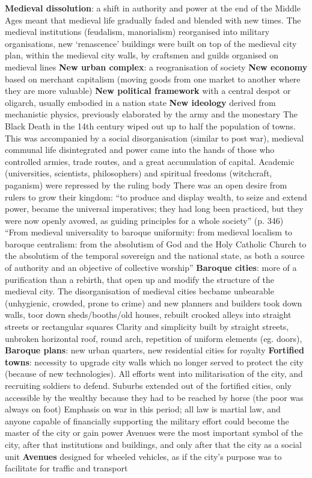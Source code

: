 \documentclass{article}
\begin{document}
\begin{outline}
	\1 \textbf{Medieval dissolution}: a shift in authority and power at the end of the Middle Ages meant that medieval life gradually faded and blended with new times. The medieval institutions (feudalism, manorialism) reorganised into military organisations, new `renascence' buildings were built on top of the medieval city plan, within the medieval city walls, by craftsmen and guilds organised on medieval lines
	\1 \textbf{New urban complex}: a reogranisation of society
		\2 \textbf{New economy} based on merchant capitalism (moving goods from one market to another where they are more valuable)
		\2 \textbf{New political framework} with a central despot or oligarch, usually embodied in a nation state
		\2 \textbf{New ideology} derived from mechanistic physics, previously elaborated by the army and the monestary
		\2 The Black Death in the 14th century wiped out up to half the population of towns. This was accompanied by a social disorganisation (similar to post war), medieval communal life disintegrated and power came into the hands of those who controlled armies, trade routes, and a great accumulation of capital. Academic (universities, scientists, philosophers) and spiritual freedoms (witchcraft, paganism) were repressed by the ruling body
		\2 There was an open desire from rulers to grow their kingdom: ``to produce and display wealth, to seize and extend power, became the universal imperatives; they had long been practiced, but they were now openly avowed, as guiding principles for a whole society'' (p. 346)
		\2 ``From medieval universality to baroque uniformity: from medieval localism to baroque centralism: from the absolutism of God and the Holy Catholic Church to the absolutism of the temporal sovereign and the national state, as both a source of authority and an objective of collective worship'' 
	\1 \textbf{Baroque cities}: more of a purification than a rebirth, that open up and modify the structure of the medieval city. The disorganisation of medieval cities becbame unbearable (unhygienic, crowded, prone to crime) and new planners and builders took down walls, toor down sheds/booths/old houses, rebuilt crooked alleys into straight streets or rectangular squares
		\2 Clarity and simplicity built by straight streets, unbroken horizontal roof, round arch, repetition of uniform elements (eg. doors), 
		\2 \textbf{Baroque plans}: new urban quarters, new residential cities for royalty
	\1 \textbf{Fortified towns}: necessity to upgrade city walls which no longer served to protect the city (because of new technologies). All efforts went into militarisation of the city, and recruiting soldiers to defend. Suburbs extended out of the fortified cities, only accessible by the wealthy because they had to be reached by horse (the poor was always on foot)
		\2 Emphasis on war in this period; all law is martial law, and anyone capable of financially supporting the military effort could become the master of the city or gain power
	\1 Avenues were the most important symbol of the city, after that institutions and buildings, and only after that the city as a social unit
		\2 \textbf{Avenues} designed for wheeled vehicles, as if the city's purpose was to facilitate for traffic and transport
\end{outline}
\end{document}

